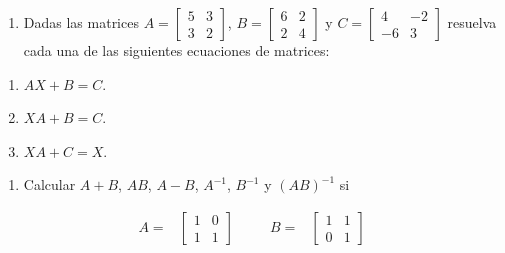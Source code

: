 \documentclass[
]{article}
\providecommand{\tightlist}{%
  \setlength{\itemsep}{0pt}\setlength{\parskip}{0pt}}
\begin{document}
\begin{enumerate}
\def\labelenumi{\arabic{enumi}.}
\setcounter{enumi}{5}
\tightlist
\item
  Dadas las matrices \(A=\begin{bmatrix} 5 & 3 \\ 3 & 2 \end{bmatrix}\),
  \(B=\begin{bmatrix} 6 & 2 \\ 2 & 4 \end{bmatrix}\) y
  \(C=\begin{bmatrix} 4 & -2 \\ -6 & 3 \end{bmatrix}\) resuelva cada una
  de las siguientes ecuaciones de matrices:
\end{enumerate}

\begin{enumerate}
\def\labelenumi{\alph{enumi})}
\tightlist
\item
  \(AX + B = C\).
\item
  \(XA + B = C\).
\item
  \(XA + C = X\).
\end{enumerate}

\begin{enumerate}
\def\labelenumi{\arabic{enumi}.}
\setcounter{enumi}{6}
\tightlist
\item
  Calcular \(A+B\), \(AB\), \(A-B\), \(A^{-1}\), \(B^{-1}\) y
  \((AB)^{-1}\) si
\end{enumerate}

\begin{equation*}
\begin{array}{ccccc}
A= & 
  \begin{bmatrix} 
    1  & 0 \\ 
    1  & 1
  \end{bmatrix}   & \,\,\,\,\,\, & 
B = &  \begin{bmatrix} 
    1  & 1 \\ 
    0  & 1
  \end{bmatrix} 
\end{array}
\end{equation*}
\end{document}

